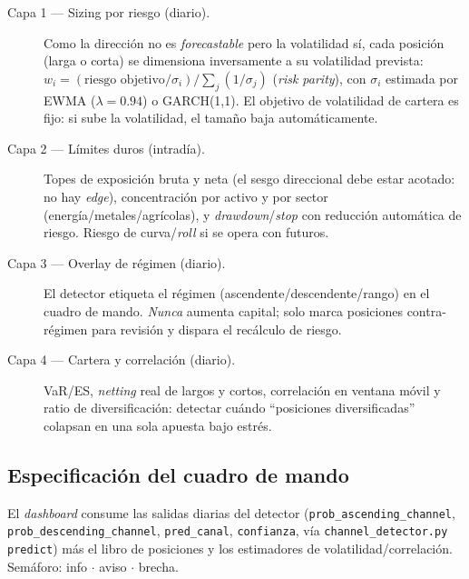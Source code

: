 \documentclass[11pt,a4paper]{article}
\begin{document}
\begin{description}
\item[Capa 1 --- Sizing por riesgo (diario).] Como la dirección no es
  \emph{forecastable} pero la volatilidad sí, cada posición (larga o corta) se
  dimensiona inversamente a su volatilidad prevista:
  $w_i = (\text{riesgo objetivo}/\sigma_i)/\sum_j (1/\sigma_j)$ (\emph{risk
  parity}), con $\sigma_i$ estimada por EWMA ($\lambda=0.94$) o GARCH(1,1). El
  objetivo de volatilidad de cartera es fijo: si sube la volatilidad, el tamaño
  baja automáticamente.
\item[Capa 2 --- Límites duros (intradía).] Topes de exposición bruta y neta (el
  sesgo direccional debe estar acotado: no hay \emph{edge}), concentración por
  activo y por sector (energía/metales/agrícolas), y \emph{drawdown}/\emph{stop}
  con reducción automática de riesgo. Riesgo de curva/\emph{roll} si se opera con
  futuros.
\item[Capa 3 --- Overlay de régimen (diario).] El detector etiqueta el régimen
  (ascendente/descendente/rango) en el cuadro de mando. \emph{Nunca} aumenta
  capital; solo marca posiciones contra-régimen para revisión y dispara el
  recálculo de riesgo.
\item[Capa 4 --- Cartera y correlación (diario).] VaR/ES, \emph{netting} real de
  largos y cortos, correlación en ventana móvil y ratio de diversificación:
  detectar cuándo ``posiciones diversificadas'' colapsan en una sola apuesta bajo
  estrés.
\end{description}

\subsection{Especificación del cuadro de mando}
El \emph{dashboard} consume las salidas diarias del detector
(\texttt{prob\_ascending\_channel}, \texttt{prob\_descending\_channel},
\texttt{pred\_canal}, \texttt{confianza}, vía
\texttt{channel\_detector.py predict}) más el libro de posiciones y los
estimadores de volatilidad/correlación. Semáforo: info $\cdot$ aviso $\cdot$
brecha.
\end{document}
